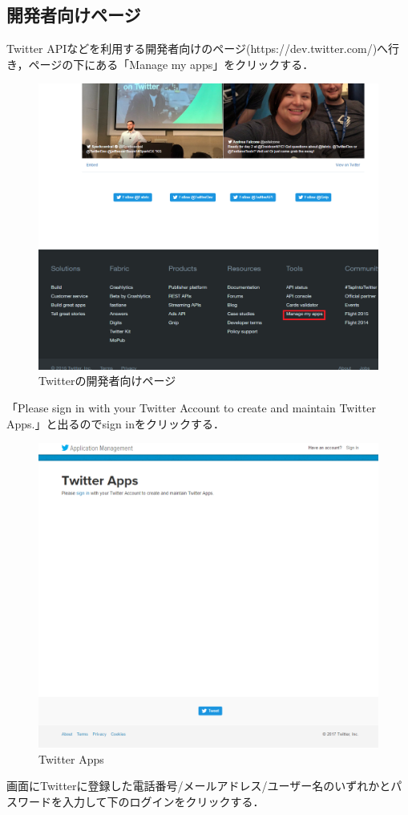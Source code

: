 \subsection{開発者向けページ}
Twitter APIなどを利用する開発者向けのページ(https://dev.twitter.com/)へ行き，ページの下にある「Manage my apps」をクリックする．

\begin{figure}[htb]
\centering
\includegraphics[width=13cm]{dev_twitter.png}
\caption{Twitterの開発者向けページ}\label{dev.twitter}
\end{figure}

\clearpage
「Please sign in with your Twitter Account to create and maintain Twitter Apps.」と出るのでsign inをクリックする．

\begin{figure}[htb]
\centering
\includegraphics[width=13cm]{sign_in.png}
\caption{Twitter Apps}\label{sign_in}
\end{figure}
\clearpage
画面にTwitterに登録した電話番号/メールアドレス/ユーザー名のいずれかとパスワードを入力して下のログインをクリックする．

